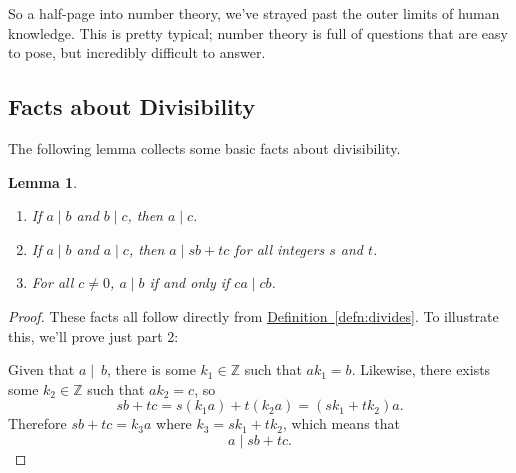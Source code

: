 \documentclass[11pt,oneside]{book}
\newtheorem{lem}[thm]{Lemma}
\theoremstyle{definition}
\newtheorem{defn}[thm]{Definition}
\begin{document}
So a half-page into number theory, we've strayed past the outer limits of human knowledge.
This is pretty typical; number theory is full of questions that are easy to pose, but incredibly difficult to answer.


 \subsection{Facts about Divisibility}
The following lemma collects some basic facts about divisibility.
\begin{lem} \label{lem:divides} \
\begin{enumerate}
\item If $a \mid b$ and $b \mid c$, then $a \mid c$.

 \item If $a \mid b$ and $a \mid c$, then $a \mid sb + tc$ for all integers $s$ and $t$.

 \item For all $c \neq 0$, $a \mid b$ if and only if $ca \mid cb$.
\end{enumerate}
\end{lem}
\begin{proof}
    These facts all follow directly from \hyperref[defn:divides]{Definition~\ref*{defn:divides}}.
    To illustrate this, we'll prove just part 2:

    Given that $a \mid\ b$, there is some $k_{1} \in \mathbb{Z}$ such that $ak_{1} = b$.
    Likewise, there exists some $k_{2} \in \mathbb{Z}$ such that $ak_{2} = c$, so
    \[ sb + tc = s(k_{1}a) + t(k_{2}a) = (sk_{1} + tk_{2})a. \]
    Therefore $sb + tc = k_{3}a$ where $k_{3} = sk_{1} + tk_{2}$, which means that
    \[ a \mid sb + tc. \]
\end{proof}

\end{document}
